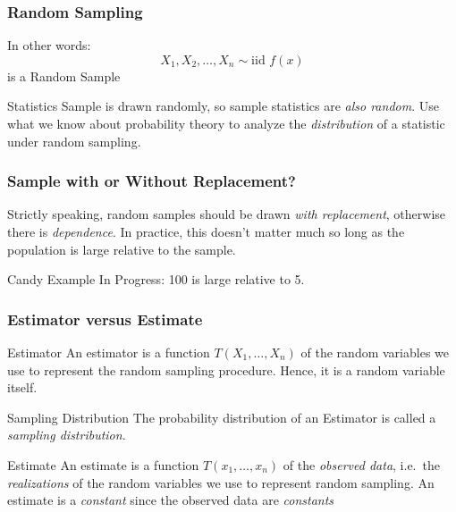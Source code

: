 \documentclass[handout]{beamer}
\begin{document}
\begin{frame}
\frametitle{Random Sampling}
In other words:
	$$X_1, X_2, \hdots, X_n \sim \mbox{iid } f(x)$$
is a \alert{Random Sample}

	\vspace{1em}
\begin{block}{Statistics}
Sample is drawn randomly, so sample statistics are \emph{also random}. Use what we know about probability theory to analyze the \emph{distribution} of a statistic under random sampling.
\end{block}
\end{frame}

\begin{frame}
\frametitle{Sample with or Without Replacement?}

Strictly speaking, random samples should be drawn \emph{with replacement}, otherwise there is \emph{dependence}. In practice, this doesn't matter much so long as the population is large relative to the sample. 

\vspace{1em}

\alert{Candy Example In Progress: 100 is large relative to 5.}
\end{frame}


\begin{frame}
\frametitle{Estimator versus Estimate}

\begin{block}{Estimator}
An estimator is a function $T(X_1, \hdots, X_n)$ of the random variables we use to represent the random sampling procedure. Hence, it is a random variable itself.
\end{block}
\pause
\begin{block}{Sampling Distribution}
The probability distribution of an Estimator is called a \emph{sampling distribution}.
\end{block}
\pause
\begin{block}{Estimate}
An estimate is a function $T(x_1, \hdots, x_n)$ of the \emph{observed data}, i.e.\ the \emph{realizations} of the random variables we use to represent random sampling. An estimate is a \emph{constant} since the observed data are \emph{constants}
\end{block}

\end{frame}

\end{document}
